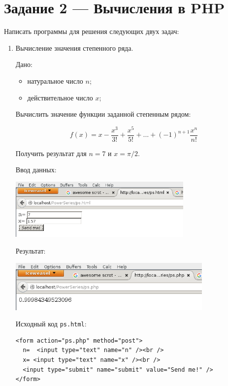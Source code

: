\section{Задание 2 --- Вычисления в PHP}

Написать программы для решения следующих двух задач:

\begin{enumerate}

\item{Вычисление значения степенного ряда.}

  Дано:

  \begin{itemize}
  \item{натуральное число $n$;}

  \item{действительное число $x$;}
  \end{itemize}
  
  Вычислить значение функции заданной степенным рядом:

  $$f(x) = x - \frac{x^3}{3!} + \frac{x^5}{5!} + ... + (-1)^{n + 1} \frac{x^n}{n!}$$

  Получить результат для $n = 7$ и $x = \pi / 2$.

  Ввод данных:

  \begin{center} 
    \includegraphics[width=9cm]{img/05.png}
  \end{center}

  Результат:

  \begin{center} 
    \includegraphics[width=10cm]{img/06.png}
  \end{center}

  Исходный код \verb|ps.html|:

\begin{verbatim}
<form action="ps.php" method="post">
  n=  <input type="text" name="n" /><br />
  x= <input type="text" name="x" /><br />
  <input type="submit" name="submit" value="Send me!" />
</form>
\end{verbatim}


\end{enumerate}
